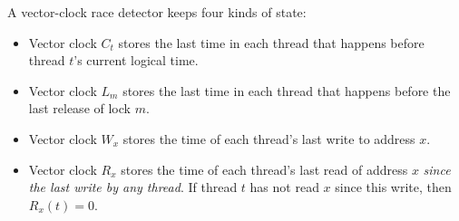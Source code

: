 \documentclass[preprint, 10pt]{sigplanconf}
\newcommand{\Tid}{t}
\newcommand{\Address}{x}
\newcommand{\Lock}{m}
\newcommand{\VCFont}{}
\newcommand{\ThreadVC}[1]{\VCFont{C}_{#1}}
\newcommand{\LockVC}[1]{\VCFont{L}_{#1}}
\newcommand{\ReadVC}[1]{\VCFont{R}_{#1}}
\newcommand{\WriteVC}[1]{\VCFont{W}_{#1}}
\begin{document}
A vector-clock race detector keeps
four kinds of state:
\begin{itemize}
\item
 Vector clock $\ThreadVC{\Tid}$ stores the last time in each thread that happens before thread $\Tid$'s current logical time.
\item
 Vector clock $\LockVC{\Lock}$ stores the last time in each thread that happens before the last release of lock $\Lock$.  
\item
 Vector clock $\WriteVC{\Address}$ stores
  the time of each thread's last write to address $\Address$.
\item
 Vector clock $\ReadVC{\Address}$ stores
  the time of each thread's last read of address $\Address$ \emph{since the last write
    by any thread}.  If thread $t$ has not read $\Address$ since this write,
  then $\ReadVC{\Address}(\Tid) = 0$.
\end{itemize}
\end{document}
